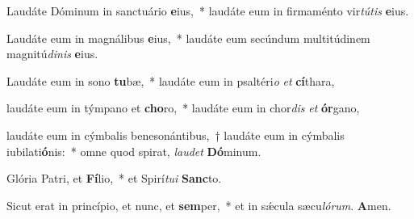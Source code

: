 \item Laudáte Dóminum in sanctuário \textbf{e}ius,~* laudáte eum in firmaménto vir\textit{tútis} \textbf{e}ius.

\item Laudáte eum in magnálibus \textbf{e}ius,~* laudáte eum secúndum multitúdinem magnitú\textit{dinis} \textbf{e}ius.

\item Laudáte eum in sono \textbf{tu}bæ,~* laudáte eum in psaltéri\textit{o} \textit{et} \textbf{cí}thara,

\item laudáte eum in týmpano et \textbf{cho}ro,~* laudáte eum in chor\textit{dis} \textit{et} \textbf{ór}gano,

\item laudáte eum in cýmbalis benesonántibus,~† laudáte eum in cýmbalis iubilati\textbf{ó}nis:~* omne quod spirat, \textit{laudet} \textbf{Dó}minum.

\item Glória Patri, et \textbf{Fí}lio,~* et Spirí\textit{tui} \textbf{Sanc}to.

\item Sicut erat in princípio, et nunc, et \textbf{sem}per,~* et in sǽcula sæcu\textit{lórum}. \textbf{A}men.


